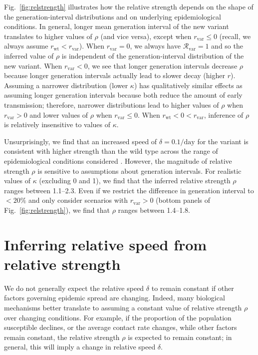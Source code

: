 \documentclass[12pt]{article}
\newcommand{\fref}[1]{Fig.~\ref{fig:#1}}
\newcommand{\vvvar}{\mathrm{var}}
\newcommand{\wwwt}{\mathrm{wt}}
\newcommand{\rx}[1]{\ensuremath{{r}_{#1}}\xspace}
\newcommand{\rw}{\rx{\wwwt}}
\newcommand{\rv}{\rx{\vvvar}}
\newcommand{\Rx}[1]{\ensuremath{{\mathcal R}_{#1}}\xspace}
\newcommand{\Rv}{\Rx{\vvvar}}
\newcommand{\pday}{\ensuremath{/\textrm{day}}}
\begin{document}
\fref{relstrength} illustrates how the relative strength depends on the shape of the generation-interval distributions and on underlying epidemiological conditions.
In general, longer mean generation interval of the new variant translates to higher values of $\rho$ (and vice versa), except when $\rv \leq 0$ (recall, we always assume $\rw<\rv$).
When $\rv = 0$, we always have $\Rv = 1$ and so the inferred value of $\rho$ is independent of the generation-interval distribution of the new variant.
When $\rv < 0$, we see that longer generation intervals decrease $\rho$ because longer generation intervals actually lead to slower decay (higher $r$).
Assuming a narrower distribution (lower $\kappa$) has qualitatively similar effects as assuming longer generation intervals because both reduce the amount of early transmission; 
therefore, narrower distributions lead to higher values of $\rho$ when $\rv > 0$ and lower values of $\rho$ when $\rv \leq 0$.
When $\rw < 0 < \rv$, inference of $\rho$ is relatively insensitive to values of $\kappa$.

Unsurprisingly, we find that an increased speed of $\delta=0.1\pday$ for the variant is consistent with higher strength than the wild type across the range of epidemiological conditions considered \citep{switzerland2021variant, davies2021estimated, di2021impact, leung2021early, volz2021transmission,zhao2021}.
However, the magnitude of relative strength $\rho$ is sensitive to assumptions about generation intervals.
For realistic values of $\kappa$ (excluding 0 and 1), we find that the inferred relative strength $\rho$ ranges between 1.1--2.3.
Even if we restrict the difference in generation interval to $<20\%$ and only consider scenarios with $\rv>0$ (bottom panels of \fref{relstrength}), we find that $\rho$ ranges between 1.4--1.8.

\section{Inferring relative speed from relative strength}

We do not generally expect the relative speed $\delta$ to remain constant if other factors governing epidemic spread are changing.
Indeed, many biological mechanisms better translate to assuming a constant value of relative strength $\rho$ over changing conditions.
For example, if the proportion of the population susceptible declines, or the average contact rate changes, while other factors remain constant, the relative strength $\rho$ is expected to remain constant; 
in general, this will imply a change in relative speed $\delta$.
\end{document}
